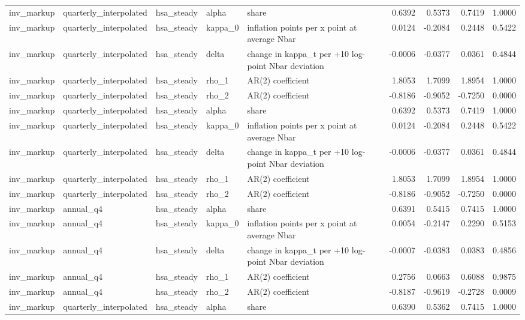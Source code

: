 \begin{tabular}{lllllrrrr}
inv\_markup & quarterly\_interpolated & hsa\_steady & alpha & share & 0.6392 & 0.5373 & 0.7419 & 1.0000 \\
inv\_markup & quarterly\_interpolated & hsa\_steady & kappa\_0 & inflation points per x point at average Nbar & 0.0124 & -0.2084 & 0.2448 & 0.5422 \\
inv\_markup & quarterly\_interpolated & hsa\_steady & delta & change in kappa\_t per +10 log-point Nbar deviation & -0.0006 & -0.0377 & 0.0361 & 0.4844 \\
inv\_markup & quarterly\_interpolated & hsa\_steady & rho\_1 & AR(2) coefficient & 1.8053 & 1.7099 & 1.8954 & 1.0000 \\
inv\_markup & quarterly\_interpolated & hsa\_steady & rho\_2 & AR(2) coefficient & -0.8186 & -0.9052 & -0.7250 & 0.0000 \\
inv\_markup & quarterly\_interpolated & hsa\_steady & alpha & share & 0.6392 & 0.5373 & 0.7419 & 1.0000 \\
inv\_markup & quarterly\_interpolated & hsa\_steady & kappa\_0 & inflation points per x point at average Nbar & 0.0124 & -0.2084 & 0.2448 & 0.5422 \\
inv\_markup & quarterly\_interpolated & hsa\_steady & delta & change in kappa\_t per +10 log-point Nbar deviation & -0.0006 & -0.0377 & 0.0361 & 0.4844 \\
inv\_markup & quarterly\_interpolated & hsa\_steady & rho\_1 & AR(2) coefficient & 1.8053 & 1.7099 & 1.8954 & 1.0000 \\
inv\_markup & quarterly\_interpolated & hsa\_steady & rho\_2 & AR(2) coefficient & -0.8186 & -0.9052 & -0.7250 & 0.0000 \\
inv\_markup & annual\_q4 & hsa\_steady & alpha & share & 0.6391 & 0.5415 & 0.7415 & 1.0000 \\
inv\_markup & annual\_q4 & hsa\_steady & kappa\_0 & inflation points per x point at average Nbar & 0.0054 & -0.2147 & 0.2290 & 0.5153 \\
inv\_markup & annual\_q4 & hsa\_steady & delta & change in kappa\_t per +10 log-point Nbar deviation & -0.0007 & -0.0383 & 0.0383 & 0.4856 \\
inv\_markup & annual\_q4 & hsa\_steady & rho\_1 & AR(2) coefficient & 0.2756 & 0.0663 & 0.6088 & 0.9875 \\
inv\_markup & annual\_q4 & hsa\_steady & rho\_2 & AR(2) coefficient & -0.8187 & -0.9619 & -0.2728 & 0.0009 \\
inv\_markup & quarterly\_interpolated & hsa\_steady & alpha & share & 0.6390 & 0.5362 & 0.7415 & 1.0000 \\

\end{tabular}
